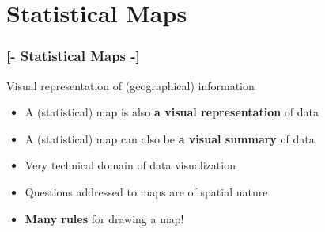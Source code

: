 \documentclass[xcolor=x11names,compress]{beamer}
\renewcommand{\(}{\begin{columns}}
\renewcommand{\)}{\end{columns}}
\newcommand{\<}[1]{\begin{column}{#1}}
\renewcommand{\>}{\end{column}}
\begin{document}
\begin{frame}
\begin{center}
\begin{itemize}
\end{itemize}
\end{center}
\end{frame}

\section{Statistical Maps}

\begin{frame} %
\frametitle{\textcolor{brique}{[-  \textbf{Statistical Maps} -]}}
Visual representation of (geographical) information
\begin{itemize}[<+-|alert@+>]
    \item A (statistical) map is also \textbf{a visual representation}  of data
    \item A (statistical) map  can also be \textbf{a visual summary} of data
    \item Very technical domain of data visualization
    \item Questions addressed to maps are of spatial nature
    \item  \textbf{Many rules} for drawing a map!
\end{itemize}
\end{frame}
\end{document}
